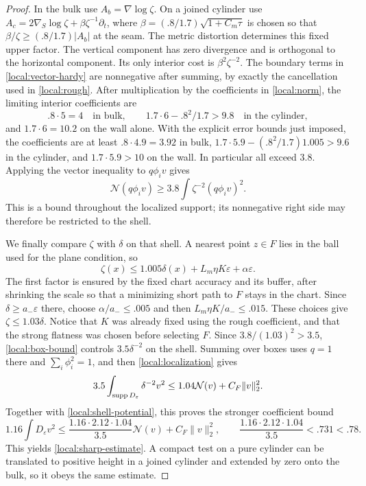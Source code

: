 \begin{proof}
In the bulk use $A_b=\nabla\log\zeta$.  On a joined cylinder use
$A_c=2\nabla_S\log\zeta+\beta\zeta^{-1}\partial_t$, where
$\beta=(.8/1.7)\sqrt{1+C_m\tau}$ is chosen so that
$\beta/\zeta\ge(.8/1.7)|A_b|$ at the seam.
The metric distortion determines this fixed upper factor.
The vertical component has zero divergence and is orthogonal to
the horizontal component.  Its only interior cost is
$\beta^2\zeta^{-2}$.  The boundary terms in
\eqref{local:vector-hardy} are nonnegative after summing, by exactly
the cancellation used in \cref{local:rough}.  After multiplication
by the coefficients in \eqref{local:norm}, the limiting interior
coefficients are
\[
 .8\cdot5=4\quad\text{in bulk},\qquad
 1.7\cdot6-.8^2/1.7>9.8\quad\text{in the cylinder},
\]
and $1.7\cdot6=10.2$ on the wall alone.  With the explicit error
bounds just imposed, the coefficients are at least $.8\cdot4.9=3.92$
in bulk, $1.7\cdot5.9-(.8^2/1.7)1.005>9.6$ in the cylinder,
and $1.7\cdot5.9>10$ on the wall.  In particular all exceed $3.8$.
Applying the vector inequality to $q\phi_iv$ gives
\begin{equation}\label{local:box-bound}
 \mathcal N(q\phi_iv)\ge
       3.8\int\zeta^{-2}(q\phi_iv)^2.
\end{equation}
This is a bound throughout the localized support; its nonnegative
right side may therefore be restricted to the shell.

We finally compare $\zeta$ with $\delta$ on that shell.  A nearest
point $z\in F$ lies in the ball used for the plane condition, so
\[
 \zeta(x)\le 1.005\delta(x)+L_m\eta K\varepsilon
                                  +\alpha\varepsilon.
\]
The first factor is ensured by the fixed chart accuracy and its
buffer, after shrinking the scale so that a minimizing short path
to $F$ stays in the chart.  Since $\delta\ge a_-\varepsilon$ there,
choose $\alpha/a_-\le .005$ and then
$L_m\eta K/a_-\le .015$.  These choices give
$\zeta\le1.03\delta$.  Notice that $K$ was already fixed using the
rough coefficient, and that the strong flatness was chosen before
selecting $F$.  Since $3.8/(1.03)^2>3.5$, \eqref{local:box-bound}
controls $3.5\delta^{-2}$ on the shell.  Summing over boxes uses
$q=1$ there and $\sum_i\phi_i^2=1$, and then
\eqref{local:localization} gives
\[
 3.5\int_{\operatorname{supp} D_\varepsilon}\delta^{-2}v^2
                  \le1.04\mathcal N(v)+C_F\|v\|_2^2.
\]
Together with \eqref{local:shell-potential}, this proves the stronger
coefficient bound
\[
 1.16\int D_\varepsilon v^2
 \le\frac{1.16\cdot2.12\cdot1.04}{3.5}\mathcal N(v)
                   +C_F\|v\|_2^2,
 \qquad
 \frac{1.16\cdot2.12\cdot1.04}{3.5}<.731<.78.
\]
This yields \eqref{local:sharp-estimate}.  A compact test on a pure
cylinder can be translated to positive height in a joined cylinder
and extended by zero onto the bulk, so it obeys the same estimate.
\end{proof}

